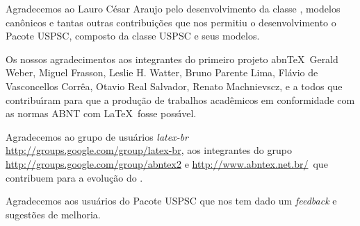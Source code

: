 \begin{agradecimentos}
	Agradecemos ao Lauro C\'esar Araujo pelo desenvolvimento da classe  \abnTeX, modelos can\^onicos e tantas outras contribui\c{c}\~oes que nos permitiu o desenvolvimento o Pacote USPSC, composto da classe USPSC e seus modelos.
	
	Os nossos agradecimentos aos integrantes do primeiro
	projeto abn\TeX\, Gerald Weber, Miguel Frasson, Leslie H. Watter, Bruno Parente Lima, Fl\'avio de Vasconcellos Corr\^ea, Otavio Real
	Salvador, Renato Machnievscz, e a todos que contribu\'{\i}ram para que a produ\c{c}\~ao de trabalhos acad\^emicos em conformidade com
	as normas ABNT com \LaTeX\ fosse poss\'{\i}vel.
	
	Agradecemos ao grupo de usu\'arios
	\emph{latex-br}  {\url{http://groups.google.com/group/latex-br}}, aos integrantes do grupo
	\emph{\abnTeX}  {\url{http://groups.google.com/group/abntex2}  e \url{http://www.abntex.net.br/}}~que contribuem para a evolu\c{c}\~ao do \abnTeX.
	
	Agradecemos aos usu\'arios do Pacote USPSC que nos tem dado um \textit{feedback} e sugest\~oes de melhoria. 
	
\end{agradecimentos}
